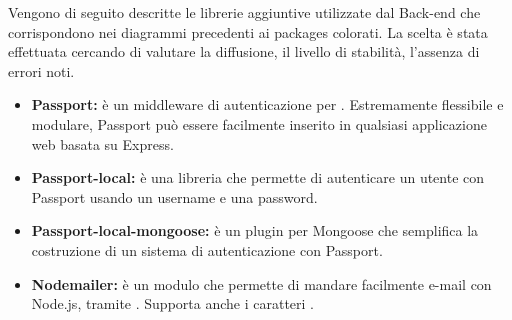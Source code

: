 Vengono di seguito descritte le librerie aggiuntive utilizzate dal Back-end che corrispondono nei diagrammi precedenti ai packages colorati. La scelta è stata effettuata cercando di valutare la diffusione, il livello di stabilità, l'assenza di errori noti.

\begin{itemize}
 \item \textbf{Passport:} è un middleware di autenticazione per . Estremamente flessibile e modulare, Passport può essere facilmente inserito in qualsiasi applicazione web basata su Express.
 \item \textbf{Passport-local:} è una libreria che permette di autenticare un utente con Passport usando un username e una password.
 \item \textbf{Passport-local-mongoose:} è un plugin per Mongoose che semplifica la costruzione di un sistema di autenticazione con Passport.
 \item \textbf{Nodemailer:} è un modulo che permette di mandare facilmente e-mail con Node.js, tramite . Supporta anche i caratteri .
\end{itemize}

